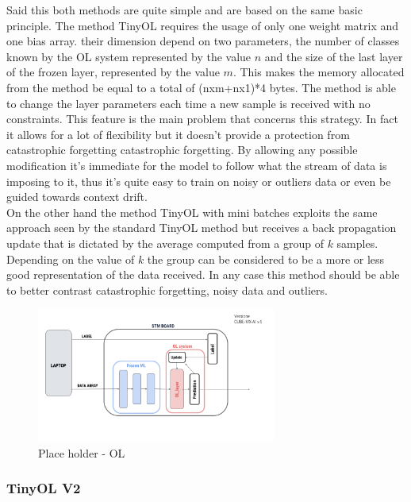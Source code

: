 \documentclass[12pt]{report}
\begin{document}
Said this both methods are quite simple and are based on the same basic principle. The method TinyOL requires the usage of only one weight matrix and one bias array. their dimension depend on two parameters, the number of classes known by the OL system represented by the value $n$ and the size of the last layer of the frozen layer, represented by the value $m$. This makes the memory allocated from the method be equal to a total of (nxm+nx1)*4 bytes. The method is able to change the layer parameters each time a new sample is received with no constraints. This feature is the main problem that concerns this strategy. In fact it allows for a lot of flexibility but it doesn't provide a protection from catastrophic forgetting catastrophic forgetting. By allowing any possible modification it's immediate for the model to follow what the stream of data is imposing to it, thus it's quite easy to train on noisy or outliers data or even be guided towards context drift.  \\
On the other hand the method TinyOL with mini batches exploits the same approach seen by the standard TinyOL method but receives a back propagation update that is dictated by the average computed from a group of $k$ samples. Depending on the value of $k$ the group can be considered to be a more or less good representation of the data received. In any case this method should be able to better contrast catastrophic forgetting, noisy data and outliers. 
%
\begin{figure}[h!]
    \centering
    \includegraphics[width=0.7\textwidth]{Figures/Chapter3/OL.png} 
    \caption{Place holder - OL}
    \label{fig:block_diag_OL}    
\end{figure}
%
\subsubsection{TinyOL V2}
\end{document}
